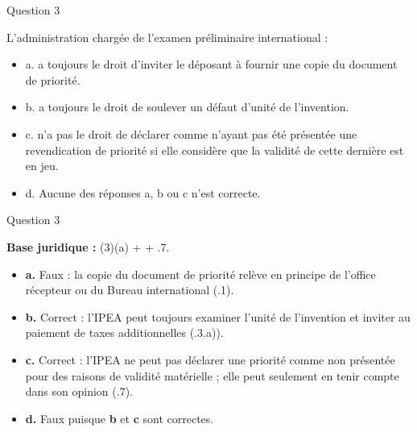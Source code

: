 \begin{frame}{Question 3}

\begin{block}{}
L’administration chargée de l’examen préliminaire international :

\begin{itemize}
  \item[$\circ$] a. a toujours le droit d’inviter le déposant à fournir une copie du document de priorité. 
  \item[$\bullet$] b. a toujours le droit de soulever un défaut d’unité de l’invention. 
  \item[$\bullet$] c. n’a pas le droit de déclarer comme n’ayant pas été présentée une revendication de 
  priorité si elle considère que la validité de cette dernière est en jeu. 
  \item[$\circ$] d. Aucune des réponses a, b ou c n’est correcte.
\end{itemize}

\end{block}

\end{frame}

\begin{frame}{Question 3}

\textbf{Base juridique :} (3)(a) +  + .7.  

\begin{itemize}
  \item[$\circ$] \textbf{a.} \; Faux : la copie du document de priorité relève en principe de l’office récepteur
  ou du Bureau international
  (.1).

  \item[$\bullet$] \textbf{b.} \; Correct : l’IPEA peut toujours examiner l’unité de l’invention et inviter
  au paiement de taxes additionnelles
  (.3.a)).

  \item[$\bullet$] \textbf{c.} \; Correct : l’IPEA ne peut pas déclarer une priorité comme non présentée
  pour des raisons de validité matérielle ; elle peut seulement en tenir compte dans son opinion
  (.7).

  \item[$\circ$] \textbf{d.} \; Faux puisque \textbf{b} et \textbf{c} sont correctes.
\end{itemize}

\end{frame}